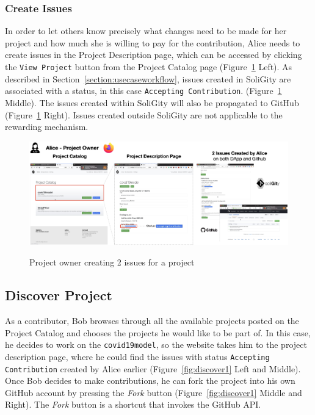 \documentclass[12pt]{article}
\renewcommand{\_}{\kern-1.5pt\textunderscore\kern-1.5pt}
\begin{document}
\subsubsection{Create Issues}
In order to let others know precisely what changes need to be made for her project and how much she is willing to pay for the contribution, Alice needs to create issues in the Project Description page, which can be accessed by clicking the \texttt{View Project} button from the Project Catalog page (Figure~\ref{fig:post2} Left). As described in Section~\ref{section:usecaseworkflow}, issues created in SoliGity are associated with a status, in this case \texttt{Accepting Contribution}. (Figure~\ref{fig:post2} Middle). The issues created within SoliGity will also be propagated to GitHub (Figure~\ref{fig:post2} Right). Issues created outside SoliGity are not applicable to the rewarding mechanism.
\begin{figure}[H]
	\centering
	\includegraphics[width=16.5cm]{graphs/51. post_2.png}\\
	\caption{Project owner creating 2 issues for a project}
	\label{fig:post2}
\end{figure}

\subsection{Discover Project}
As a contributor, Bob browses through all the available projects posted on the Project Catalog and chooses the projects he would like to be part of. In this case, he decides to work on the \texttt{covid19model}, so the website takes him to the project description page, where he could find the issues with status \texttt{Accepting Contribution} created by Alice earlier (Figure~\ref{fig:discover1} Left and Middle). Once Bob decides to make contributions, he can fork the project into his own GitHub account by pressing the \textit{Fork} button (Figure~\ref{fig:discover1} Middle and Right). The \textit{Fork} button is a shortcut that invokes the GitHub API.
\end{document}
